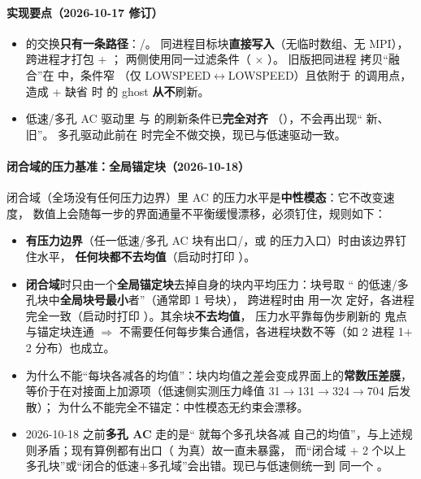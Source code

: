 \paragraph{实现要点（2026-10-17 修订）}
\begin{itemize}
  \item {} 的交换\textbf{只有一条路径}：/。
        同进程目标块\textbf{直接写入}（无临时数组、无 MPI），跨进程才打包 $+$ ；
        两侧使用同一过滤条件（ $\times$ ）。
        旧版把同进程  拷贝“融合”在  中，条件窄
        （仅 LOWSPEED$\leftrightarrow$LOWSPEED）且依附于  的调用点，
        造成  + 缺省  时  的 ghost \textbf{从不}刷新。
  \item 低速/多孔 AC 驱动里  与  的刷新条件已\textbf{完全对齐}
        （），不会再出现“ 新、 旧”。
        多孔驱动此前在  时完全不做交换，现已与低速驱动一致。
\end{itemize}

\paragraph{闭合域的压力基准：全局锚定块（2026-10-18）}
闭合域（全场没有任何压力边界）里 AC 的压力水平是\textbf{中性模态}：它不改变速度，
数值上会随每一步的界面通量不平衡缓慢漂移，必须钉住，规则如下：
\begin{itemize}
  \item \textbf{有压力边界}（任一低速/多孔 AC 块有出口/，或
         的压力入口）时由该边界钉住水平，
        \textbf{任何块都不去均值}（启动时打印 ）。
  \item \textbf{闭合域}时只由一个\textbf{全局锚定块}去掉自身的块内平均压力：块号取
        “ 的低速/多孔块中\textbf{全局块号最小}者”（通常即 1 号块），
        跨进程时由  用一次  定好，各进程
        完全一致（启动时打印 ）。其余块\textbf{不去均值}，
        压力水平靠每伪步刷新的  鬼点与锚定块连通
        $\Rightarrow$ 不需要任何每步集合通信，各进程块数不等（如 2 进程 1$+$2 分布）也成立。
  \item 为什么不能“每块各减各的均值”：块内均值之差会变成界面上的\textbf{常数压差膜}，
        等价于在对接面上加源项（低速侧实测压力峰值 31$\to$131$\to$324$\to$704 后发散）；
        为什么不能完全不锚定：中性模态无约束会漂移。
  \item 2026-10-18 之前\textbf{多孔 AC} 走的是“ 就每个多孔块各减
        自己的均值”，与上述规则矛盾；现有算例都有出口（ 为真）故一直未暴露，
        而“闭合域 $+$ 2 个以上多孔块”或“闭合的低速$+$多孔域”会出错。现已与低速侧统一到
        同一个 。
\end{itemize}

